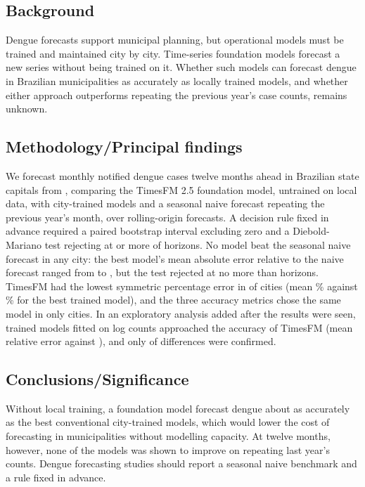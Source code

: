 \documentclass[10pt,letterpaper]{article}
\begin{document}
\subsection*{Background}
Dengue forecasts support municipal planning, but operational models must be trained and maintained city by city. Time-series foundation models forecast a new series without being trained on it. Whether such models can forecast dengue in Brazilian municipalities as accurately as locally trained models, and whether either approach outperforms repeating the previous year's case counts, remains unknown.

\subsection*{Methodology/Principal findings}
We forecast monthly notified dengue cases twelve months ahead in  Brazilian state capitals from , comparing the TimesFM 2.5 foundation model, untrained on local data, with  city-trained models and a seasonal naive forecast repeating the previous year's month, over  rolling-origin forecasts. A decision rule fixed in advance required a paired bootstrap interval excluding zero and a Diebold-Mariano test rejecting at  or more of  horizons. No model beat the seasonal naive forecast in any city: the best model's mean absolute error relative to the naive forecast ranged from  to , but the test rejected at no more than  horizons. TimesFM had the lowest symmetric percentage error in  of  cities (mean \% against \% for the best trained model), and the three accuracy metrics chose the same model in only  cities. In an exploratory analysis added after the results were seen, trained models fitted on log counts approached the accuracy of TimesFM (mean relative error  against ), and only  of  differences were confirmed.

\subsection*{Conclusions/Significance}
Without local training, a foundation model forecast dengue about as accurately as the best conventional city-trained models, which would lower the cost of forecasting in municipalities without modelling capacity. At twelve months, however, none of the models was shown to improve on repeating last year's counts. Dengue forecasting studies should report a seasonal naive benchmark and a rule fixed in advance.
\end{document}
